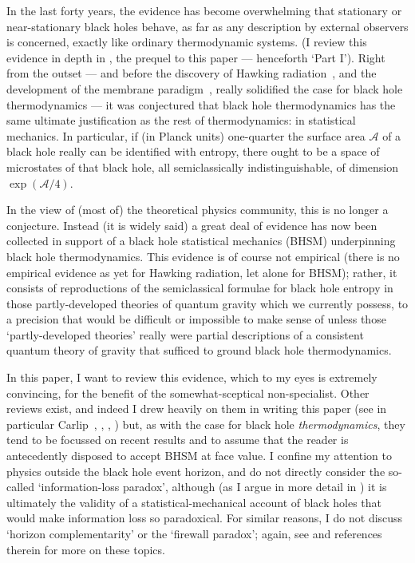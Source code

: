 \documentclass[12pt]{article}
\newcommand{\mc}[1]{\ensuremath{\mathcal{#1}}}
\begin{document}
In the last forty years, the evidence has become overwhelming that stationary or near-stationary black holes behave, as far as any description by external observers is concerned, exactly like ordinary thermodynamic systems. (I review this evidence in depth in , the prequel to this paper --- henceforth `Part I'). Right from the outset --- and before the discovery of Hawking radiation~\cite{hawking1975}, and the development of the membrane paradigm~\cite{membraneparadigm}, really solidified the case for black hole thermodynamics --- it was conjectured that black hole thermodynamics has the same ultimate justification as the rest of thermodynamics: in statistical mechanics. In particular, if (in Planck units) one-quarter the surface area $\mc{A}$ of a black hole really can be identified with entropy, there ought to be a space of microstates of that black hole, all semiclassically indistinguishable, of dimension $\exp(\mc{A}/4)$.

In the view of (most of) the theoretical physics community, this is no longer a conjecture. Instead (it is widely said) a great deal of evidence has now been collected in support of a black hole statistical mechanics (BHSM) underpinning black hole thermodynamics. This evidence is of course not empirical (there is no empirical evidence as yet for Hawking radiation, let alone for BHSM); rather, it consists of reproductions of the semiclassical formulae for black hole entropy in those partly-developed theories of quantum gravity which we currently possess, to a precision that would be difficult or impossible to make sense of unless those `partly-developed theories' really were partial descriptions of a consistent quantum theory of gravity that sufficed to ground black hole thermodynamics.

In this paper, I want to review this evidence, which to my eyes is extremely convincing, for the benefit of the somewhat-sceptical non-specialist. Other reviews exist, and indeed I drew heavily on them in writing this paper (see in particular Carlip~\citeyear{carlipreview,carlipreview2}, , ,  ) but, as with the case for black hole \emph{thermodynamics}, they tend to be focussed on recent results and to assume that the reader is antecedently disposed to accept BHSM at face value. I confine my attention to physics outside the black hole event horizon, and do not directly consider the so-called `information-loss paradox', although (as I argue in more detail in ) it is ultimately the validity of a statistical-mechanical account of black holes that would make information loss so paradoxical. For similar reasons, I do not discuss `horizon complementarity' or the `firewall paradox'; again, see  and references therein for more on these topics.
\end{document}
